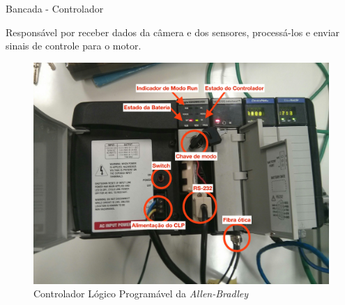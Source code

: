 \documentclass[10pt]{beamer}
\begin{document}
\begin{frame}[fragile]{Bancada - Controlador}
\begin{block}{}
Responsável por receber dados da câmera e dos sensores, processá-los e enviar sinais de controle para o motor.
\end{block}
\begin{figure}[!ht]
	\centering
	\includegraphics[width=.6\linewidth]{figures/fundamentos/CLP}
	\caption{Controlador Lógico Programável da \textit{Allen-Bradley}}
	\label{clpfig}
\end{figure}
\end{frame}
\end{document}
